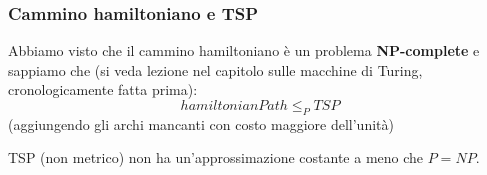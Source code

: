 																      	\subsubsection{Cammino hamiltoniano e TSP}
																      	Abbiamo visto che il cammino hamiltoniano è un problema \textbf{NP-complete} e
																      	sappiamo che (si veda lezione nel capitolo sulle macchine di Turing,
																      	cronologicamente fatta prima):
																      	\[hamiltonianPath\leq_P TSP\]
																      	(aggiungendo gli archi mancanti con costo maggiore dell'unità)
																      	\begin{definizione}
																      		TSP (non metrico) non ha un'approssimazione costante a meno che $P=NP$.
																      	\end{definizione}
